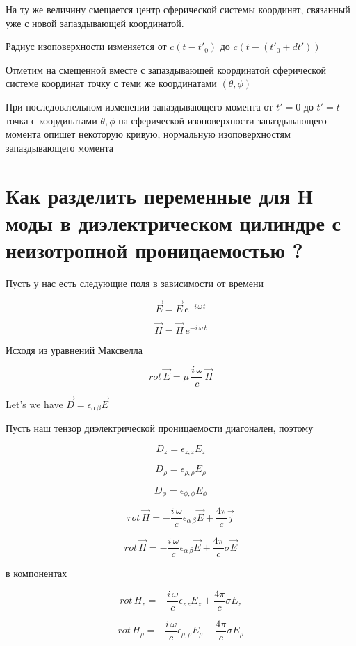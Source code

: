 \documentclass{article}
\begin{document}
На ту же величину смещается центр сферической системы координат, связанный уже с новой запаздывающей координатой.

Радиус изоповерхности изменяется от $c(t-t'_{0})$ до $c(t-(t'_{0} + d t'))$

Отметим на смещенной вместе с запаздывающей координатой сферической системе координат точку с теми же координатами $(\theta, \phi)$

При последовательном изменении запаздывающего момента от $t'=0$ до $t'=t$ точка с координатами $\theta, \phi$ на сферической изоповерхности запаздывающего момента опишет некоторую кривую, нормальную изоповерхностям запаздывающего момента


\section{Как разделить переменные для Н моды в диэлектрическом цилиндре с неизотропной проницаемостью ?}


Пусть у нас есть следующие поля в зависимости от времени

$$\vec{E} = \vec{E}\,e^{-i\,\omega\,t}$$

$$\vec{H} = \vec{H}\,e^{-i\,\omega\,t}$$

Исходя из уравнений Максвелла

$$rot\,\vec{E} = \mu\,\frac{i\,\omega}{c}\,\vec{H}$$

Let's we have $\vec D = \epsilon_{\alpha\,\beta} \vec{E}$

Пусть наш тензор диэлектрической проницаемости диагонален, поэтому

$$D_{z} = \epsilon_{z,z} {E}_z$$

$$D_{\rho} = \epsilon_{\rho, \rho} {E}_\rho$$

$$D_{\phi} = \epsilon_{\phi, \phi} {E}_\phi$$

$$rot\,\vec{H} = - \frac{i\,\omega}{c} \epsilon_{\alpha\,\beta} \vec{E} + \frac{4\pi}{c}\vec{j}$$

$$rot\,\vec{H} = - \frac{i\,\omega}{c} \epsilon_{\alpha\,\beta} \vec{E} + \frac{4\pi}{c} \sigma \vec{E}$$

в компонентах

$$rot\,{H}_{z} = - \frac{i\,\omega}{c} \epsilon_{z\,z} {E}_{z} + \frac{4\pi}{c} \sigma {E}_{z}$$

$$rot\,{H}_{\rho} = - \frac{i\,\omega}{c} \epsilon_{\rho,\rho} {E}_{\rho} + \frac{4\pi}{c} \sigma {E}_{\rho}$$
\end{document}
